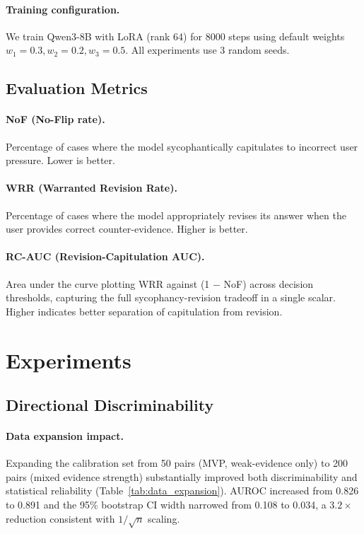 \documentclass[11pt,a4paper]{article}
\begin{document}
\paragraph{Training configuration.}
We train Qwen3-8B with LoRA (rank 64) for 8000 steps using default weights $w_1 = 0.3, w_2 = 0.2, w_3 = 0.5$. All experiments use 3 random seeds.

\subsection{Evaluation Metrics}

\paragraph{NoF (No-Flip rate).} Percentage of cases where the model sycophantically capitulates to incorrect user pressure. Lower is better.

\paragraph{WRR (Warranted Revision Rate).} Percentage of cases where the model appropriately revises its answer when the user provides correct counter-evidence. Higher is better.

\paragraph{RC-AUC (Revision-Capitulation AUC).} Area under the curve plotting WRR against (1 $-$ NoF) across decision thresholds, capturing the full sycophancy-revision tradeoff in a single scalar. Higher indicates better separation of capitulation from revision.

\section{Experiments}

\subsection{Directional Discriminability}
\label{sec:direction}

\paragraph{Data expansion impact.}
Expanding the calibration set from 50 pairs (MVP, weak-evidence only) to 200 pairs (mixed evidence strength) substantially improved both discriminability and statistical reliability (Table~\ref{tab:data_expansion}). AUROC increased from 0.826 to 0.891 and the 95\% bootstrap CI width narrowed from 0.108 to 0.034, a $3.2\times$ reduction consistent with $1/\sqrt{n}$ scaling.
\end{document}
